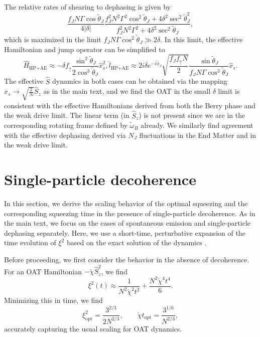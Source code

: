 The relative rates of shearing to dephasing is given by
\begin{equation}
     \frac{ f_J N \Gamma \cos \tilde{\theta}_J}{ 4 |\delta|} \frac{f_J^2 N^2 \Gamma^2 \cos^2 \tilde{\theta}_J + 4 \delta^2 \sec^2 \tilde{\theta}_J^2}{f_J^2 N^2 \Gamma^2+4 \delta^2 \sec^2 \tilde{\theta}_J }, 
\end{equation}
which is maximized in the limit $f_J N \Gamma \cos^2 \tilde{\theta}_J \gg 2\delta$. In this limit, the effective Hamiltonian and jump operator can be simplified to
\begin{subequations}
    \begin{equation}
        \hat H_{\text{HP+AE}}\approx - \delta f_{\uparrow} \frac{\sin^2 \tilde{\theta}_J}{2 \cos^3 \tilde{\theta}_J} \hat x_s^2,
    \end{equation}
    \begin{equation}
        \hat l_{\text{HP+AE}} \approx 2 i \delta e^{- i \tilde{\phi}_J} \sqrt{\frac{f_J f_{\uparrow} N}{2}} \frac{\sin \tilde{\theta}_J}{ f_J N \Gamma \cos^3 \tilde{\theta}_J} \hat x_s.
    \end{equation}
\end{subequations}
The effective $\hat S$ dynamics in both cases can be obtained via the mapping $\hat x_s \to \sqrt{\frac{2}{N}} \hat S_z$ as in the main text, and we find the OAT in the small $\delta$ limit is consistent with the effective Hamiltonians derived from both the Berry phase and the weak drive limit. The linear term (in $\hat S_z$) is not present since we are in the corresponding rotating frame defined by $\tilde{\omega}_B$ already. We similarly find agreement with the effective dephasing derived via $N_J$ fluctuations in the End Matter and in the weak drive limit.


\section{Single-particle decoherence}
\label{sec:decoherence}

In this section, we derive the scaling behavior of the optimal squeezing and the corresponding squeezing time in the presence of single-particle decoherence. As in the main text, we focus on the cases of spontaneous emission and single-particle dephasing separately. Here, we use a short-time, perturbative expansion of the time evolution of $\xi^2$ based on the exact solution of the dynamics \cite{Chu2021}.

Before proceeding, we first consider the behavior in the absence of decoherence. For an OAT Hamiltonian $-\check{\chi} \hat S_z^2$, we find
\begin{equation}
    \xi^2(t) \approx \frac{1}{N^2 \check{\chi}^2 t^2} + \frac{N^2 \check{\chi}^4 t^4}{6}.
\end{equation}
Minimizing this in time, we find
\begin{equation}
    \xi^2_{\text{opt}} = \frac{3^{2/3}}{2 N^{2/3}}, \qquad
    \check{\chi} t_{\text{opt}} = \frac{3^{1/6}}{N^{2/3}},
\end{equation}
accurately capturing the usual scaling for OAT dynamics. 

